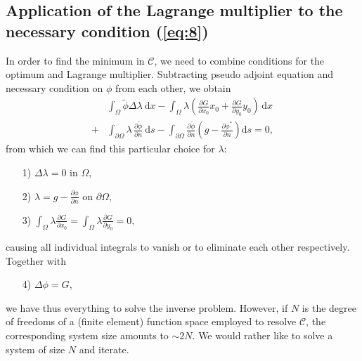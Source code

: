 \subsection{Application of the Lagrange multiplier to the necessary condition (\ref{eq:8})}
In order to find the minimum in $\mathcal{C}$, we need to combine conditions for the optimum and Lagrange multiplier. 
Subtracting pseudo adjoint equation and necessary condition on $\phi$ from each other, we obtain
\begin{align}\label{eq:13}
	&\int_\Omega \widetilde{\phi} \Delta\lambda \:\mathrm{d}x
	-\int_\Omega\lambda \left( 
	\frac{\partial G}{\partial x_0}x_0+\frac{\partial G}{\partial y_0}y_0
	\right)\,\mathrm{d}x\\
	+&\int_{\partial \Omega} \lambda \,\frac{\partial\widetilde{\phi}}{\partial n}\:\mathrm{d}s
	-\int_{\partial\Omega} \frac{\partial\widetilde{\phi}}{\partial n} 
		\left(g-\frac{\partial\phi^*}{\partial n}\right) \mathrm{d}s
	= 0,\nonumber
\end{align}
from which we can find this particular choice for $\lambda$:
\begin{itemize}
	\item[1)] $\Delta\lambda=0$ in $\Omega$,
	\item[2)] $\lambda=g-\frac{\partial\phi}{\partial n}$ on $\partial\Omega$,
	\item[3)] $\int_{\Omega}\lambda\frac{\partial G}{\partial x_0}
			  =\int_{\Omega}\lambda\frac{\partial G}{\partial y_0} = 0,$
\end{itemize}
causing all individual integrals to vanish or to eliminate each other respectively.
Together with 
\begin{itemize}
	\item[4)] $\Delta\phi=G$,
\end{itemize}
we have thus everything to solve the inverse problem. However, if $N$ is the degree of freedoms of a (finite element) function space employed to resolve $\mathcal{C}$, the corresponding system size amounts to $\sim 2N$. We would rather like to solve a system of size $N$ and iterate. 

